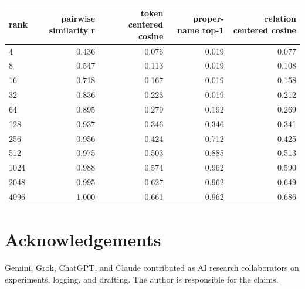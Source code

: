 \documentclass[11pt]{article}
\begin{document}
\begin{center}
\small
\begin{tabular}{lrrrr}
\toprule
rank & pairwise similarity r & token centered cosine & proper-name top-1 & relation centered cosine \\
\midrule
4 & 0.436 & 0.076 & 0.019 & 0.077 \\
8 & 0.547 & 0.113 & 0.019 & 0.108 \\
16 & 0.718 & 0.167 & 0.019 & 0.158 \\
32 & 0.836 & 0.223 & 0.019 & 0.212 \\
64 & 0.895 & 0.279 & 0.192 & 0.269 \\
128 & 0.937 & 0.346 & 0.346 & 0.341 \\
256 & 0.956 & 0.424 & 0.712 & 0.425 \\
512 & 0.975 & 0.503 & 0.885 & 0.513 \\
1024 & 0.988 & 0.574 & 0.962 & 0.590 \\
2048 & 0.995 & 0.627 & 0.962 & 0.649 \\
4096 & 1.000 & 0.661 & 0.962 & 0.686 \\
\bottomrule
\end{tabular}
\end{center}


\section*{Acknowledgements}
Gemini, Grok, ChatGPT, and Claude contributed as AI research collaborators
on experiments, logging, and drafting. The author is responsible for the
claims.



\end{document}
